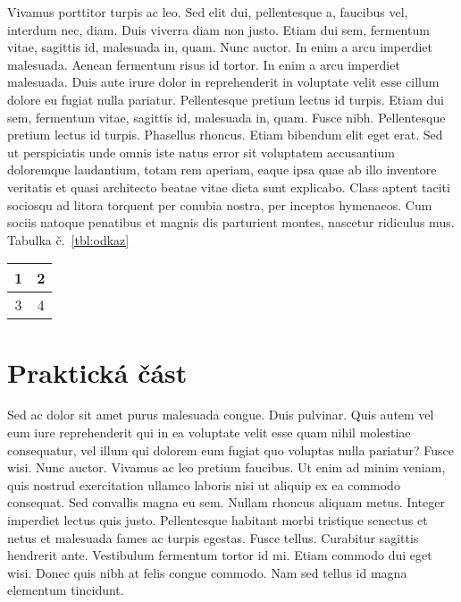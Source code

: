 Vivamus porttitor turpis ac leo. Sed elit dui, pellentesque a, faucibus vel, interdum nec, diam. Duis viverra diam non justo. Etiam dui sem, fermentum vitae, sagittis id, malesuada in, quam. Nunc auctor. In enim a arcu imperdiet malesuada. Aenean fermentum risus id tortor. In enim a arcu imperdiet malesuada. Duis aute irure dolor in reprehenderit in voluptate velit esse cillum dolore eu fugiat nulla pariatur. Pellentesque pretium lectus id turpis. Etiam dui sem, fermentum vitae, sagittis id, malesuada in, quam. Fusce nibh. Pellentesque pretium lectus id turpis. Phasellus rhoncus. Etiam bibendum elit eget erat. Sed ut perspiciatis unde omnis iste natus error sit voluptatem accusantium doloremque laudantium, totam rem aperiam, eaque ipsa quae ab illo inventore veritatis et quasi architecto beatae vitae dicta sunt explicabo. Class aptent taciti sociosqu ad litora torquent per conubia nostra, per inceptos hymenaeos. Cum sociis natoque penatibus et magnis dis parturient montes, nascetur ridiculus mus. Tabulka č.~\ref{tbl:odkaz}

\begin{centering}
  \begin{tabular}{|c|c|}
    \hline
    1 & 2 \\
    \hline
    3 & 4 \\
    \hline
  \end{tabular}
  \label{tbl:odkaz}
\end{centering}

\section{Praktická část}
Sed ac dolor sit amet purus malesuada congue. Duis pulvinar. Quis autem vel eum iure reprehenderit qui in ea voluptate velit esse quam nihil molestiae consequatur, vel illum qui dolorem eum fugiat quo voluptas nulla pariatur? Fusce wisi. Nunc auctor. Vivamus ac leo pretium faucibus. Ut enim ad minim veniam, quis nostrud exercitation ullamco laboris nisi ut aliquip ex ea commodo consequat. Sed convallis magna eu sem. Nullam rhoncus aliquam metus. Integer imperdiet lectus quis justo. Pellentesque habitant morbi tristique senectus et netus et malesuada fames ac turpis egestas. Fusce tellus. Curabitur sagittis hendrerit ante. Vestibulum fermentum tortor id mi. Etiam commodo dui eget wisi. Donec quis nibh at felis congue commodo. Nam sed tellus id magna elementum tincidunt.

